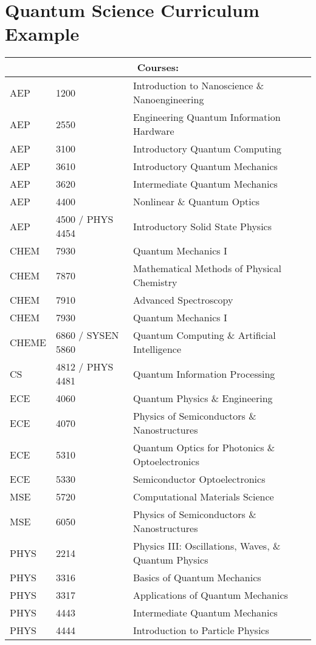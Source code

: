 \chapter{\LARGE{Quantum Science Curriculum Example}}

{
\normalsize\begin{tabular}{ |p{1.5cm}||p{3cm}|p{9cm}| }
 \hline
 \multicolumn{3}{|c|}{Courses:} \\
 \hline
AEP & 1200 & Introduction to Nanoscience \& Nanoengineering\\
AEP & 2550 & Engineering Quantum Information Hardware\\
AEP & 3100 & Introductory Quantum Computing\\
AEP & 3610 & Introductory Quantum Mechanics\\
AEP & 3620 & Intermediate Quantum Mechanics\\
AEP & 4400 & Nonlinear \& Quantum Optics\\
AEP & 4500 / PHYS 4454 & Introductory Solid State Physics\\
CHEM & 7930 & Quantum Mechanics I\\
CHEM & 7870 & Mathematical Methods of Physical Chemistry\\
CHEM & 7910 & Advanced Spectroscopy\\
CHEM & 7930 & Quantum Mechanics I\\
CHEME & 6860 / SYSEN 5860 & Quantum Computing \& Artificial Intelligence\\
CS & 4812 / PHYS 4481 & Quantum Information Processing\\
ECE & 4060 & Quantum Physics \& Engineering\\
ECE & 4070 & Physics of Semiconductors \& Nanostructures\\
ECE & 5310 & Quantum Optics for Photonics \& Optoelectronics\\
ECE & 5330 & Semiconductor Optoelectronics\\
MSE & 5720 & Computational Materials Science\\
MSE & 6050 & Physics of Semiconductors \& Nanostructures\\
PHYS & 2214 & Physics III: Oscillations, Waves, \& Quantum Physics\\
PHYS & 3316 & Basics of Quantum Mechanics\\
PHYS & 3317 & Applications of Quantum Mechanics\\
PHYS & 4443 & Intermediate Quantum Mechanics\\
PHYS & 4444 & Introduction to Particle Physics\\

\end{tabular}}

